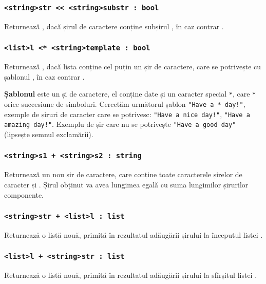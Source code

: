 \subsubsection{\lstinline|<string>str << <string>substr : bool|}

Returnează \true{}, dacă șirul de caractere  conține subșirul , în caz contrar \false{}.

\subsubsection{\lstinline|<list>l <* <string>template : bool|}

Returnează \true{}, dacă lista  conține cel puțin un șir de caractere, care se potrivește cu șablonul , în caz contrar \false{}.

{\bf Șablonul} este un și de caractere, el conține date și un caracter special \lstinline`*`, care \lstinline`*` orice succesiune de simboluri. Cercetăm următorul șablon \lstinline|"Have a * day!"|, exemple de șiruri de caracter care se potrivesc: \lstinline|"Have a nice day!"|, \lstinline|"Have a amazing day!"|. Exemplu de șir care nu se potrivește \lstinline|"Have a good day"| (lipsește semnul exclamării).

\subsubsection{\lstinline|<string>s1 + <string>s2 : string|}

Returnează un nou șir de caractere, care conține toate caracterele șirelor de caracter  și . Șirul obținut va avea lungimea egală cu suma lungimilor șirurilor componente.

\subsubsection{\lstinline|<string>str + <list>l : list|}

Returnează o listă nouă, primită în rezultatul adăugării șirului  la începutul listei .

\subsubsection{\lstinline|<list>l + <string>str : list|}

Returnează o listă nouă, primită în rezultatul adăugării șirului  la sfîrșitul listei .

